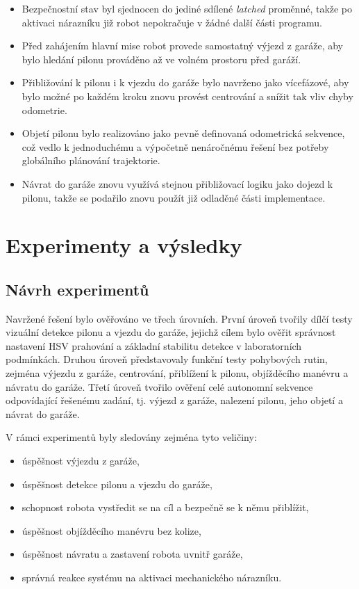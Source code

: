 \documentclass[a4paper,11pt]{article}
\begin{document}
\begin{itemize}[leftmargin=1.2cm]
  \item Bezpečnostní stav byl sjednocen do jediné sdílené \textit{latched} proměnné, takže po aktivaci nárazníku již robot nepokračuje v žádné další části programu.
  \item Před zahájením hlavní mise robot provede samostatný výjezd z garáže, aby bylo hledání pilonu prováděno až ve volném prostoru před garáží.
  \item Přibližování k pilonu i k vjezdu do garáže bylo navrženo jako vícefázové, aby bylo možné po každém kroku znovu provést centrování a snížit tak vliv chyby odometrie.
  \item Objetí pilonu bylo realizováno jako pevně definovaná odometrická sekvence, což vedlo k jednoduchému a výpočetně nenáročnému řešení bez potřeby globálního plánování trajektorie.
  \item Návrat do garáže znovu využívá stejnou přibližovací logiku jako dojezd k pilonu, takže se podařilo znovu použít již odladěné části implementace.
\end{itemize}

\section{Experimenty a výsledky}

\subsection{Návrh experimentů}
Navržené řešení bylo ověřováno ve třech úrovních. První úroveň tvořily dílčí testy vizuální detekce pilonu a vjezdu do garáže, jejichž cílem bylo ověřit správnost nastavení HSV prahování a základní stabilitu detekce v laboratorních podmínkách. Druhou úroveň představovaly funkční testy pohybových rutin, zejména výjezdu z garáže, centrování, přiblížení k pilonu, objížděcího manévru a návratu do garáže. Třetí úroveň tvořilo ověření celé autonomní sekvence odpovídající řešenému zadání, tj. výjezd z garáže, nalezení pilonu, jeho objetí a návrat do garáže.

V rámci experimentů byly sledovány zejména tyto veličiny:
\begin{itemize}[leftmargin=1.2cm]
    \item úspěšnost výjezdu z garáže,
    \item úspěšnost detekce pilonu a vjezdu do garáže,
    \item schopnost robota vystředit se na cíl a bezpečně se k němu přiblížit,
    \item úspěšnost objížděcího manévru bez kolize,
    \item úspěšnost návratu a zastavení robota uvnitř garáže,
    \item správná reakce systému na aktivaci mechanického nárazníku.
\end{itemize}
\end{document}
